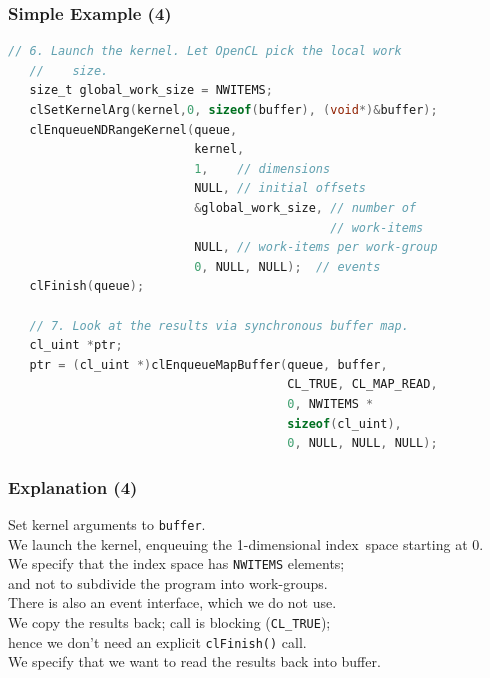 \begin{frame}[fragile]
  \frametitle{Simple Example (4)}



  \begin{lstlisting}[language=C]
   // 6. Launch the kernel. Let OpenCL pick the local work
   //    size.
   size_t global_work_size = NWITEMS;
   clSetKernelArg(kernel,0, sizeof(buffer), (void*)&buffer);
   clEnqueueNDRangeKernel(queue,
                          kernel,
                          1,    // dimensions
                          NULL, // initial offsets
                          &global_work_size, // number of
                                             // work-items
                          NULL, // work-items per work-group
                          0, NULL, NULL);  // events
   clFinish(queue);

   // 7. Look at the results via synchronous buffer map.
   cl_uint *ptr;
   ptr = (cl_uint *)clEnqueueMapBuffer(queue, buffer,
                                       CL_TRUE, CL_MAP_READ,
                                       0, NWITEMS *
                                       sizeof(cl_uint),
                                       0, NULL, NULL, NULL);
  \end{lstlisting}

\end{frame}

\begin{frame}
  \frametitle{Explanation (4)}


    Set kernel arguments to {\tt buffer}.\\[.5em]
    We launch the kernel, enqueuing the 1-dimensional index~space starting
      at 0.\\[.5em]
    We specify that the index space has {\tt NWITEMS} elements; \\and not to
      subdivide the program into work-groups.\\[.5em]
    There is also an event interface, which we do not use.\\[2em]

    We copy the results back; call is blocking ({\tt CL\_TRUE});\\
    \qquad hence we don't need an explicit {\tt clFinish()} call.\\[.5em]
    We specify that we want to read the results back into buffer.

\end{frame}

